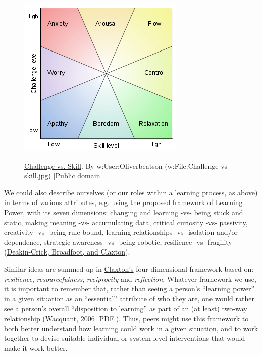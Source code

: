 \begin{figure}
\href{http://commons.wikimedia.org/wiki/File\%3AChallenge\_vs\_skill.svg}{\includegraphics{../pictures/challenge.png}}
\caption*{
 \href{http://commons.wikimedia.org/wiki/File\%3AChallenge\_vs\_skill.svg}{Challenge
 vs. Skill}. By w:User:Oliverbeatson (w:File:Challenge vs skill.jpg)
{[}Public domain{]}}
\end{figure}


We could also describe ourselves (or our roles within a learning
process, as above) in terms of various attributes, e.g. using the
proposed framework of Learning Power, with its seven dimensions:
changing and learning -vs- being stuck and static, making meaning -vs-
accumulating data, critical curiosity -vs- passivity, creativity -vs-
being rule-bound, learning relationships -vs- isolation and/or
dependence, strategic awareness -vs- being robotic, resilience -vs-
fragility
(\href{http://scholar.google.com/scholar?cluster=3482923183291547169\&hl=en\&as\_sdt=0,14}{Deakin-Crick,
Broadfoot, and Claxton}).

Similar ideas are summed up in
\href{http://www.amazon.com/Building-Learning-Power-Helping-Learners/dp/1901219437/ref=sr\_1\_1?s=books\&ie=UTF8\&qid=1354332972\&sr=1-1\&keywords=Building+Learning+Power\%3A+Helping+Young+People+Become+Better+Learners}{Claxton's}
four-dimensional framework based on: \emph{resilience},
\emph{resourcefulness}, \emph{reciprocity} and \emph{reflection}.
Whatever framework we use, it is important to remember that, rather than
seeing a person's ``learning power'' in a given situation as an
``essential'' attribute of who they are, one would rather see a person's
overall ``disposition to learning'' as part of an (at least) two-way
relationship
(\href{\%20http://www.umsl.edu/~keelr/3210/resources/PIERREBOURDIEU-KEYTHINK-REV2006.pdf}{Wacquant,
2006} {[}PDF{]}). Thus, peers might use this framework to both better
understand how learning could work in a given situation, and to work
together to devise suitable individual or system-level interventions
that would make it work better.

